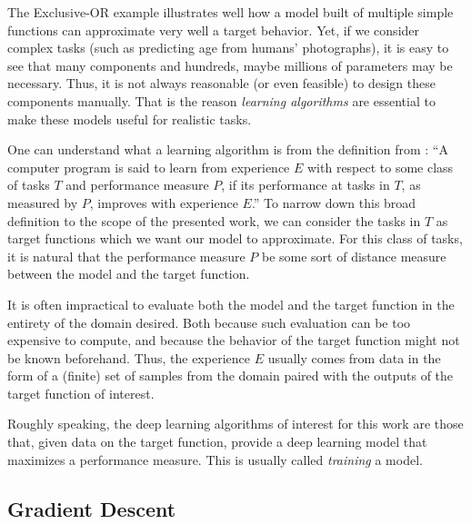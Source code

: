 The Exclusive-OR example illustrates well how a model built of multiple simple functions can approximate very well a target behavior.
Yet, if we consider complex tasks (such as predicting age from humans' photographs), it is easy to see that many components and hundreds, maybe millions of parameters may be necessary\footnotemark.
Thus, it is not always reasonable (or even feasible) to design these components manually.
That is the reason \textit{learning algorithms} are essential to make these models useful for realistic tasks.


One can understand what a learning algorithm is from the definition from \textcite{mitchell_machine_1997}:
``A computer program is said to learn from experience $E$ with respect to some class of tasks $T$ and performance measure $P$, if its performance at tasks in $T$, as measured by $P$, improves with experience $E$.''
To narrow down this broad definition to the scope of the presented work, we can consider the tasks in $T$ as target functions which we want our model to approximate.
For this class of tasks, it is natural that the performance measure $P$ be some sort of distance measure between the model and the target function.

It is often impractical to evaluate both the model and the target function in the entirety of the domain desired.
Both because such evaluation can be too expensive to compute, and because the behavior of the target function might not be known beforehand.
Thus, the experience $E$ usually comes from data in the form of a (finite) set of samples from the domain paired with the outputs of the target function of interest.

Roughly speaking, the deep learning algorithms of interest for this work are those that, given data on the target function, provide a deep learning model that maximizes a performance measure.
This is usually called \emph{training} a model.

\subsection{Gradient Descent}

